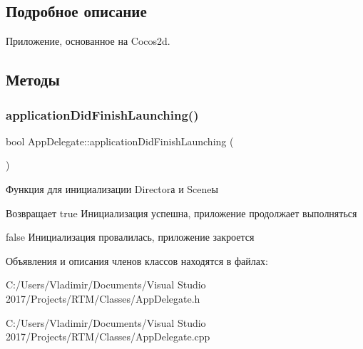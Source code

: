 \subsection{Подробное описание}
Приложение, основанное на Cocos2d. 

\subsection{Методы}
\mbox{\label{class_app_delegate_a68cbaed49edf7581dc59a09d5062fff3}} 
\subsubsection{\texorpdfstring{application\+Did\+Finish\+Launching()}{applicationDidFinishLaunching()}}
{\footnotesize\ttfamily bool App\+Delegate\+::application\+Did\+Finish\+Launching (\begin{DoxyParamCaption}{ }\end{DoxyParamCaption})\hspace{0.3cm}{\ttfamily [virtual]}}

Функция для инициализации Director\textquotesingle{}а и Scene\textquotesingle{}ы \begin{DoxyReturn}{Возвращает}
true Инициализация успешна, приложение продолжает выполняться 

false Инициализация провалилась, приложение закроется 
\end{DoxyReturn}


Объявления и описания членов классов находятся в файлах\+:\begin{DoxyCompactItemize}
\item 
C\+:/\+Users/\+Vladimir/\+Documents/\+Visual Studio 2017/\+Projects/\+R\+T\+M/\+Classes/App\+Delegate.\+h\item 
C\+:/\+Users/\+Vladimir/\+Documents/\+Visual Studio 2017/\+Projects/\+R\+T\+M/\+Classes/App\+Delegate.\+cpp\end{DoxyCompactItemize}
